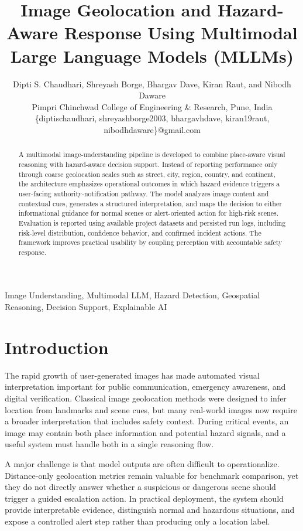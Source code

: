 \documentclass[10pt,conference]{IEEEtran}
\title{Image Geolocation and Hazard-Aware Response Using Multimodal Large Language Models (MLLMs)}
\author{
Dipti S. Chaudhari, Shreyash Borge, Bhargav Dave, Kiran Raut, and Nibodh Daware\\
Pimpri Chinchwad College of Engineering \& Research, Pune, India\\
\{diptischaudhari, shreyashborge2003, bhargavhdave, kiran19raut, nibodhdaware\}@gmail.com
}
\begin{document}
\maketitle

\begin{abstract}
A multimodal image-understanding pipeline is developed to combine place-aware visual reasoning with hazard-aware decision support. Instead of reporting performance only through coarse geolocation scales such as street, city, region, country, and continent, the architecture emphasizes operational outcomes in which hazard evidence triggers a user-facing authority-notification pathway. The model analyzes image content and contextual cues, generates a structured interpretation, and maps the decision to either informational guidance for normal scenes or alert-oriented action for high-risk scenes. Evaluation is reported using available project datasets and persisted run logs, including risk-level distribution, confidence behavior, and confirmed incident actions. The framework improves practical usability by coupling perception with accountable safety response.
\end{abstract}

\begin{IEEEkeywords}
Image Understanding, Multimodal LLM, Hazard Detection, Geospatial Reasoning, Decision Support, Explainable AI
\end{IEEEkeywords}

\section{Introduction}
The rapid growth of user-generated images has made automated visual interpretation important for public communication, emergency awareness, and digital verification. Classical image geolocation methods were designed to infer location from landmarks and scene cues, but many real-world images now require a broader interpretation that includes safety context. During critical events, an image may contain both place information and potential hazard signals, and a useful system must handle both in a single reasoning flow.

A major challenge is that model outputs are often difficult to operationalize. Distance-only geolocation metrics remain valuable for benchmark comparison, yet they do not directly answer whether a suspicious or dangerous scene should trigger a guided escalation action. In practical deployment, the system should provide interpretable evidence, distinguish normal and hazardous situations, and expose a controlled alert step rather than producing only a location label.
\end{document}
